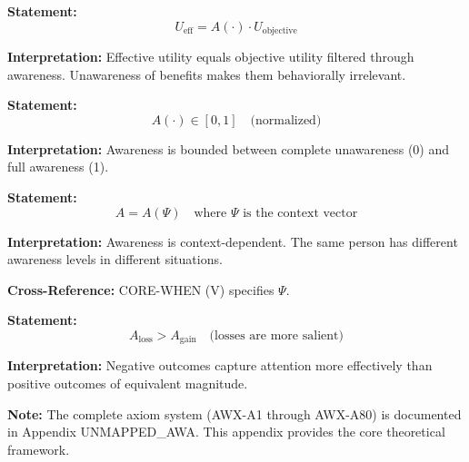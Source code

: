 \begin{tcolorbox}[colback=gray!5!white, colframe=gray!75!black,
    title=Axiom AWX-A1: Core Transformation]
\textbf{Statement:}
\begin{equation}
U_{\text{eff}} = A(\cdot) \cdot U_{\text{objective}}
\end{equation}

\textbf{Interpretation:} Effective utility equals objective utility filtered through awareness.
Unawareness of benefits makes them behaviorally irrelevant.
\end{tcolorbox}

\begin{tcolorbox}[colback=gray!5!white, colframe=gray!75!black,
    title=Axiom AWX-A2: Boundedness]
\textbf{Statement:}
\begin{equation}
A(\cdot) \in [0, 1] \quad \text{(normalized)}
\end{equation}

\textbf{Interpretation:} Awareness is bounded between complete unawareness (0) and
full awareness (1).
\end{tcolorbox}

\begin{tcolorbox}[colback=gray!5!white, colframe=gray!75!black,
    title=Axiom AWX-A3: Context Dependence]
\textbf{Statement:}
\begin{equation}
A = A(\Psi) \quad \text{where } \Psi \text{ is the context vector}
\end{equation}

\textbf{Interpretation:} Awareness is context-dependent. The same person has
different awareness levels in different situations.

\textbf{Cross-Reference:} CORE-WHEN (V) specifies $\Psi$.
\end{tcolorbox}

\begin{tcolorbox}[colback=gray!5!white, colframe=gray!75!black,
    title=Axiom AWX-A4: Asymmetry (Gains vs. Losses)]
\textbf{Statement:}
\begin{equation}
A_{\text{loss}} > A_{\text{gain}} \quad \text{(losses are more salient)}
\end{equation}

\textbf{Interpretation:} Negative outcomes capture attention more effectively
than positive outcomes of equivalent magnitude.
\end{tcolorbox}

\textbf{Note:} The complete axiom system (AWX-A1 through AWX-A80) is documented
in Appendix UNMAPPED_AWA. This appendix provides the core theoretical framework.

